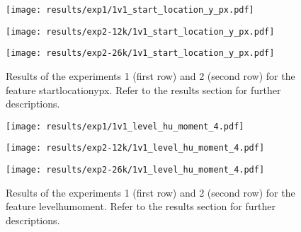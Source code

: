  
\begin{figure}[h!]
    \centering
	\begin{minipage}{0.3\linewidth}
		\texttt{[image: results/exp1/1v1\_start\_location\_y\_px.pdf]}
	\end{minipage}

	\begin{minipage}{0.3\linewidth}
		\texttt{[image: results/exp2-12k/1v1\_start\_location\_y\_px.pdf]}
	\end{minipage}
	\begin{minipage}{0.3\linewidth}
		\texttt{[image: results/exp2-26k/1v1\_start\_location\_y\_px.pdf]}
	\end{minipage}

	\caption[ Results: Feature start\textunderscore location\textunderscore y\textunderscore px]{ Results of the experiments 1 (first row) and 2 (second row) for the feature start\textunderscore location\textunderscore y\textunderscore px. Refer to the results section for further descriptions. }
	\label{fig:appendix_start_location_y_px}
\end{figure}
 
\begin{figure}[h!]
    \centering
	\begin{minipage}{0.3\linewidth}
		\texttt{[image: results/exp1/1v1\_level\_hu\_moment\_4.pdf]}
	\end{minipage}

	\begin{minipage}{0.3\linewidth}
		\texttt{[image: results/exp2-12k/1v1\_level\_hu\_moment\_4.pdf]}
	\end{minipage}
	\begin{minipage}{0.3\linewidth}
		\texttt{[image: results/exp2-26k/1v1\_level\_hu\_moment\_4.pdf]}
	\end{minipage}

	\caption[ Results: Feature level\textunderscore hu\textunderscore moment]{ Results of the experiments 1 (first row) and 2 (second row) for the feature level\textunderscore hu\textunderscore moment. Refer to the results section for further descriptions. }
	\label{fig:appendix_level_hu_moment_4}
\end{figure}
 \newpage 

